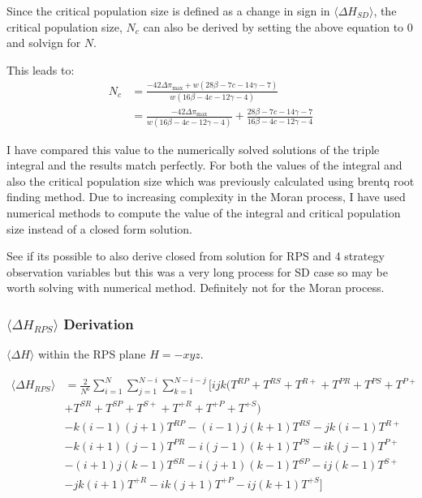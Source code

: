 \documentclass[./main.tex]{subfiles}
\begin{document}
Since the critical population size is defined as a change in sign in 
$\langle \Delta H_{SD} \rangle$, the critical population size, $N_c$ can also be derived by setting
the above equation to 0 and solvign for $N$.


This leads to:
\begin{align}
N_c &= \frac{-42 \Delta \pi_{\text{max}} + w(28\beta - 7c  - 14 \gamma - 7)}{w(16 \beta - 4c -12\gamma - 4)}\nonumber\\
&= \frac{-42 \Delta \pi_{\text{max}}}{w(16 \beta - 4c -12\gamma - 4)}
+ \frac{28 \beta - 7c - 14\gamma - 7}{16 \beta - 4c -12\gamma - 4}\nonumber
\end{align}

I have compared this value to the numerically solved solutions of the triple integral 
and the results match perfectly. For both the values of the integral
and also the critical population size which was previously calculated using brentq root 
finding method.
Due to increasing complexity in the Moran process, I have used numerical methods to 
compute the value of the integral and critical population size instead of a closed form 
solution.

See if its possible to also derive closed from solution for RPS and 4 strategy 
observation variables but this was a very long process for SD case so 
may be worth solving with numerical method.
Definitely not for the Moran process.



\subsubsection{$\langle \Delta H_{RPS} \rangle$ Derivation}

$\langle \Delta H \rangle$ within the RPS plane $H = -xyz$.

\begin{equation} \nonumber
\begin{aligned}
  \langle \Delta H_{RPS} \rangle &= \frac{2}{N^6} \sum_{i=1}^{N}\sum_{j=1}^{N-i}\sum_{k=1}^{N-i-j}\Big[ijk(T^{RP} + T^{RS} + T^{R+} + T^{PR} + T^{PS} + T^{P+} \nonumber\\
  &+ T^{SR} + T^{SP} + T^{S+} + T^{+R} + T^{+P} + T^{+S})\nonumber \\
  &- k(i-1)(j+1)T^{RP} - (i-1)j(k+1)T^{RS} - jk(i-1)T^{R+}\nonumber \\
  &- k(i+1)(j-1)T^{PR} - i(j-1)(k+1)T^{PS} - ik(j-1)T^{P+}\nonumber \\
  &- (i+1)j(k-1)T^{SR} - i(j+1)(k-1)T^{SP} - ij(k-1)T^{S+} \nonumber\\
  &- jk(i+1)T^{+R} - ik(j+1)T^{+P} - ij(k+1)T^{+S}\Big]\nonumber
\end{aligned}
\end{equation}
\end{document}
